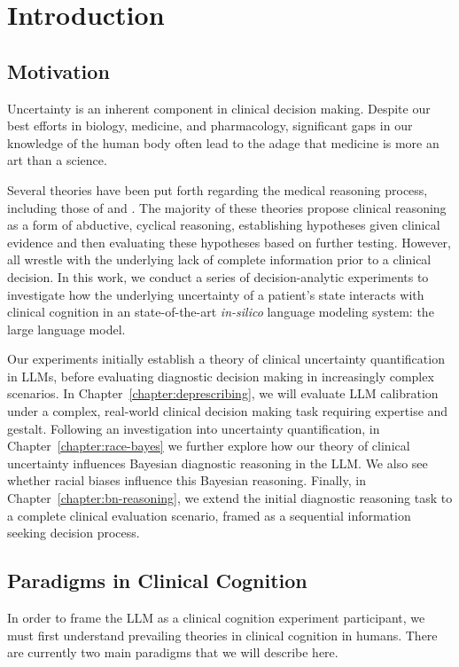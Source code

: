 \chapter{Introduction} \label{chapter:intro}

\section{Motivation}

Uncertainty is an inherent component in clinical decision making. Despite our best efforts in biology, medicine, and pharmacology, significant gaps in our knowledge of the human body often lead to the adage that medicine is more an art than a science. 

Several theories have been put forth regarding the medical reasoning process, including those of \citet{blois1984information} and \citet{paukerThresholdApproachClinical1980}. The majority of these theories propose clinical reasoning as a form of abductive, cyclical reasoning, establishing hypotheses given clinical evidence and then evaluating these hypotheses based on further testing. However, all wrestle with the underlying lack of complete information prior to a clinical decision. In this work, we conduct a series of decision-analytic experiments to investigate how the underlying uncertainty of a patient's state interacts with clinical cognition in an state-of-the-art \textit{in-silico} language modeling system: the large language model. 

Our experiments initially establish a theory of clinical uncertainty quantification in LLMs, before evaluating diagnostic decision making in increasingly complex scenarios. In Chapter~\ref{chapter:deprescribing}, we will evaluate LLM calibration under a complex, real-world clinical decision making task requiring expertise and gestalt. Following an investigation into uncertainty quantification, in Chapter~\ref{chapter:race-bayes} we further explore how our theory of clinical uncertainty influences Bayesian diagnostic reasoning in the LLM. We also see whether racial biases influence this Bayesian reasoning. Finally, in Chapter~\ref{chapter:bn-reasoning}, we extend the initial diagnostic reasoning task to a complete clinical evaluation scenario, framed as a sequential information seeking decision process.

\section{Paradigms in Clinical Cognition}
\label{subchapter:paradigms-clinical-cognition}
In order to frame the LLM as a clinical cognition experiment participant, we must first understand prevailing theories in clinical cognition in humans. There are currently two main paradigms that we will describe here. 

